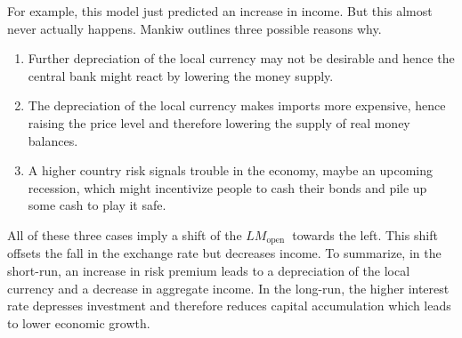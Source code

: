 \documentclass[10pt]{article}
\begin{document}
For example, this model just predicted an increase in income. But this almost never actually happens. Mankiw outlines three possible reasons why.

\begin{enumerate}
  \item Further depreciation of the local currency may not be desirable and hence the central bank might react by lowering the money supply.
  \item The depreciation of the local currency makes imports more expensive, hence raising the price level and therefore lowering the supply of real money balances.
  \item A higher country risk signals trouble in the economy, maybe an upcoming recession, which might incentivize people to cash their bonds and pile up some cash to play it safe.
\end{enumerate}

All of these three cases imply a shift of the $L M_{\text {open }}$ towards the left. This shift offsets the fall in the exchange rate but decreases income. To summarize, in the short-run, an increase in risk premium leads to a depreciation of the local currency and a decrease in aggregate income. In the long-run, the higher interest rate depresses investment and therefore reduces capital accumulation which leads to lower economic growth.
\end{document}
